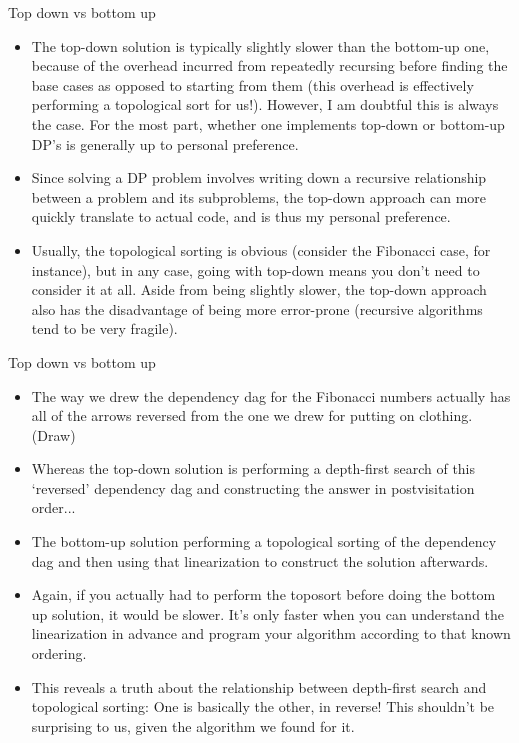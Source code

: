 \documentclass{beamer}
\begin{document}
\begin{frame}{Top down vs bottom up}
    \begin{itemize}
        \item The top-down solution is typically slightly slower than the bottom-up one, because of the overhead incurred from repeatedly recursing before finding the base cases as opposed to starting from them (this overhead is effectively performing a topological sort for us!). However, I am doubtful this is always the case. For the most part, whether one implements top-down or bottom-up DP's is generally up to personal preference. \pause  
        \item Since solving a DP problem involves writing down a recursive relationship between a problem and its subproblems, the top-down approach can more quickly translate to actual code, and is thus my personal preference. 
        \item Usually, the topological sorting is obvious (consider the Fibonacci case, for instance), but in any case, going with top-down means you don't need to consider it at all. Aside from being slightly slower, the top-down approach also has the disadvantage of being more error-prone (recursive algorithms tend to be very fragile).
    \end{itemize}
\end{frame}

\begin{frame}{Top down vs bottom up}
    \begin{itemize}
        \item The way we drew the dependency dag for the Fibonacci numbers actually has all of the arrows reversed from the one we drew for putting on clothing. (Draw) \pause 
        \item Whereas the top-down solution is performing a depth-first search of this `reversed' dependency dag and constructing the answer in postvisitation order...
        \item The bottom-up solution performing a topological sorting of the dependency dag and then using that linearization to construct the solution afterwards. \pause
        \item Again, if you actually had to perform the toposort before doing the bottom up solution, it would be slower. It's only faster when you can understand the linearization in advance and program your algorithm according to that known ordering. \pause 
        \item This reveals a truth about the relationship between depth-first search and topological sorting: One is basically the other, in reverse! This shouldn't be surprising to us, given the algorithm we found for it.
    \end{itemize}
\end{frame}
\end{document}
